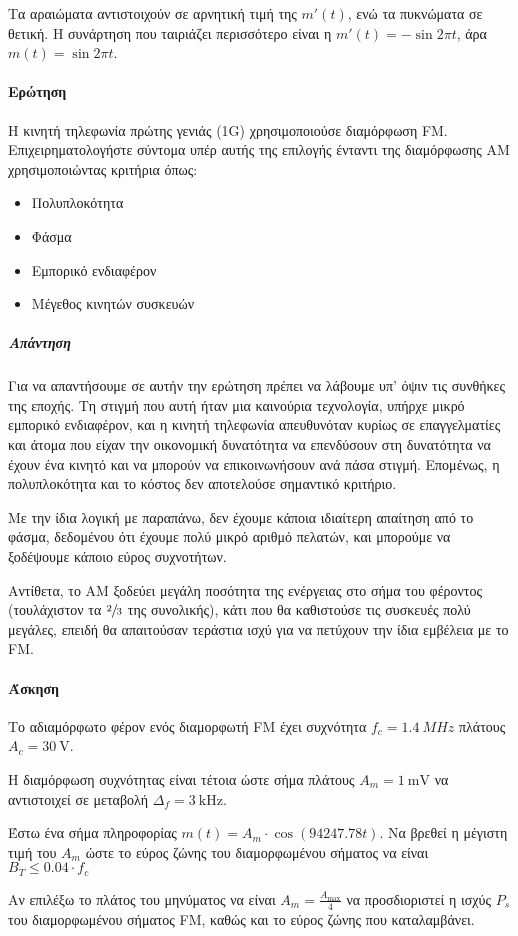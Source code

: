 \documentclass[11pt,a4paper,notitlepage,fleqn]{article}
\begin{document}
Τα αραιώματα αντιστοιχούν σε αρνητική τιμή της \( m'(t) \), ενώ τα πυκνώματα σε θετική. Η
συνάρτηση που ταιριάζει περισσότερο είναι η \( m'(t) = -\sin 2πt \), άρα \( m(t) = \sin 2πt \).

\paragraph{Ερώτηση}
Η κινητή τηλεφωνία πρώτης γενιάς (1G) χρησιμοποιούσε διαμόρφωση FM. Επιχειρηματολογήστε
σύντομα υπέρ αυτής της επιλογής ένταντι της διαμόρφωσης AM χρησιμοποιώντας κριτήρια όπως:
\begin{itemize}
	\item Πολυπλοκότητα
	\item Φάσμα
	\item Εμπορικό ενδιαφέρον
	\item Μέγεθος κινητών συσκευών
\end{itemize}
\subparagraph{Απάντηση}
Για να απαντήσουμε σε αυτήν την ερώτηση πρέπει να λάβουμε υπ' όψιν τις συνθήκες της εποχής.
Τη στιγμή που αυτή ήταν μια καινούρια τεχνολογία, υπήρχε μικρό εμπορικό ενδιαφέρον, και
η κινητή τηλεφωνία απευθυνόταν κυρίως σε επαγγελματίες και άτομα που είχαν την οικονομική
δυνατότητα να επενδύσουν στη δυνατότητα να έχουν ένα κινητό και να μπορούν να επικοινωνήσουν
ανά πάσα στιγμή. Επομένως, η πολυπλοκότητα και το κόστος δεν αποτελούσε σημαντικό κριτήριο.

Με την ίδια λογική με παραπάνω, δεν έχουμε κάποια ιδιαίτερη απαίτηση από το φάσμα, δεδομένου
ότι έχουμε πολύ μικρό αριθμό πελατών, και μπορούμε να ξοδέψουμε κάποιο εύρος συχνοτήτων.

Αντίθετα, το AM ξοδεύει μεγάλη ποσότητα της ενέργειας στο σήμα του φέροντος
(τουλάχιστον τα \( \sfrac{2}{3} \) της συνολικής), κάτι που θα
καθιστούσε τις συσκευές πολύ μεγάλες, επειδή θα απαιτούσαν τεράστια ισχύ για να πετύχουν
την ίδια εμβέλεια με το FM.

\paragraph{Άσκηση}
Το αδιαμόρφωτο φέρον ενός διαμορφωτή FM έχει συχνότητα \( f_c = \SI{1.4}{MHz} \) πλάτους
\( A_c = \SI{30}{\volt} \).

Η διαμόρφωση συχνότητας είναι τέτοια ώστε σήμα πλάτους \( A_m = \SI{1}{\milli\volt} \)
να αντιστοιχεί σε μεταβολή \( Δ_f = \SI{3}{\kilo\hertz} \).

\begin{enumgreekpar}
	\item Έστω ένα σήμα πληροφορίας \( m(t) = A_m \cdot \cos(94247.78 t) \).
	Να βρεθεί η μέγιστη τιμή του \( A_m \) ώστε το εύρος ζώνης του διαμορφωμένου σήματος
	να είναι \( B_T \leq 0.04\cdot f_c \)
	\item Αν επιλέξω το πλάτος του μηνύματος να είναι \( A_m = \frac{A_{\max}}{4} \)
	να προσδιοριστεί η ισχύς \( P_s \) του διαμορφωμένου σήματος FM, καθώς και το εύρος
	ζώνης που καταλαμβάνει.
\end{enumgreekpar}
\end{document}
